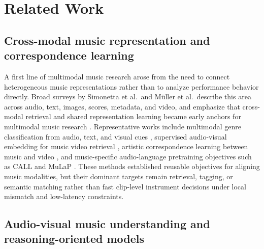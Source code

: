 \section{Related Work}
\label{sec:related_work}

\subsection{Cross-modal music representation and correspondence learning}

A first line of multimodal music research arose from the need to connect heterogeneous music representations rather than to analyze performance behavior directly. Broad surveys by Simonetta et al.\ and M{\"u}ller et al.\ describe this area across audio, text, images, scores, metadata, and video, and emphasize that cross-modal retrieval and shared representation learning became early anchors for multimodal music research \citep{Simonetta2019Survey,Muller2019CrossModalSurvey}. Representative works include multimodal genre classification from audio, text, and visual cues \citep{Oramas2018Genre}, supervised audio-visual embedding for music video retrieval \citep{Zeng2018AVMusicRetrieval}, artistic correspondence learning between music and video \citep{Suris2022ArtisticCorrespondence}, and music-specific audio-language pretraining objectives such as CALL and MuLaP \citep{Manco2022CALLMusic,Manco2022MuLaP}. These methods established reusable objectives for aligning music modalities, but their dominant targets remain retrieval, tagging, or semantic matching rather than fast clip-level instrument decisions under local mismatch and low-latency constraints.

\subsection{Audio-visual music understanding and reasoning-oriented models}

